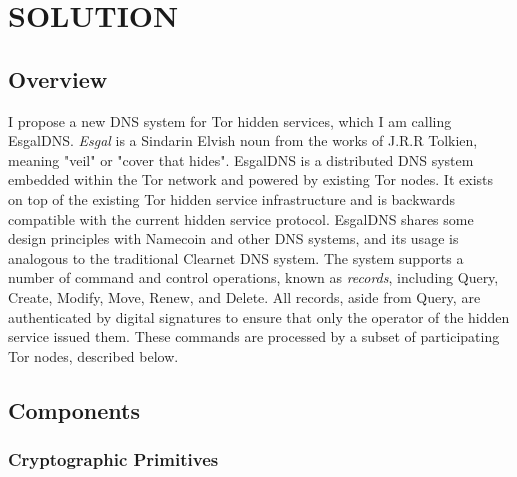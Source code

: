 
\chapter{\uppercase{Solution}}

\section{Overview}

I propose a new DNS system for Tor hidden services, which I am calling EsgalDNS. \textit{Esgal} is a Sindarin Elvish noun from the works of J.R.R Tolkien, meaning "veil" or "cover that hides".\cite{SindarinDict} EsgalDNS is a distributed DNS system embedded within the Tor network and powered by existing Tor nodes. It exists on top of the existing Tor hidden service infrastructure and is backwards compatible with the current hidden service protocol. EsgalDNS shares some design principles with Namecoin and other DNS systems, and its usage is analogous to the traditional Clearnet DNS system. The system supports a number of command and control operations, known as \textit{records}, including Query, Create, Modify, Move, Renew, and Delete. All records, aside from Query, are authenticated by digital signatures to ensure that only the operator of the hidden service issued them. These commands are processed by a subset of participating Tor nodes, described below.

\section{Components}

\subsection{Cryptographic Primitives}

